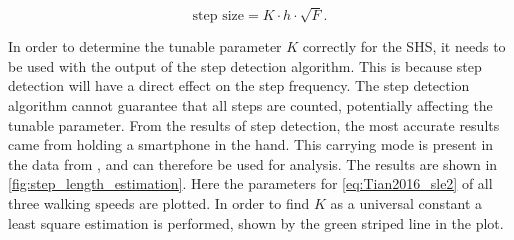 \begin{equation}
\label{eq:Tian2016_sle2}
\text{step size} = K \cdot h \cdot \sqrt{F}.
\end{equation}

In order to determine the tunable parameter $K$ correctly for the SHS, it needs to be used with the output of the step detection algorithm. This is because step detection will have a direct effect on the step frequency. The step detection algorithm cannot guarantee that all steps are counted, potentially affecting the tunable parameter. 
From the results of step detection, the most accurate results came from holding a smartphone in the hand. This carrying mode is present in the data from \cite{Vezocnik2019}, and can therefore be used for analysis. The results are shown in \cref{fig:step_length_estimation}. Here the parameters for \eqref{eq:Tian2016_sle2} of all three walking speeds are plotted. In order to find $K$ as a universal constant a least square estimation is performed, shown by the green striped line in the plot.
